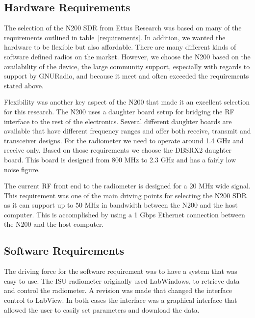 \subsection{Hardware Requirements}

The selection of the N200 SDR from Ettus Research was based on many of the requirements outlined in table~\ref{requirements}.  In addition, we wanted the hardware to be flexible but also affordable.  There are many different kinds of software defined radios on the market.  However, we choose the N200 based on the availability of the device, the large community support, especially with regards to support by GNURadio, and because it meet and often exceeded the requirements stated above.  

Flexibility was another key aspect of the N200 that made it an excellent selection for this research.  The N200 uses a daughter board setup for bridging the RF interface to the rest of the electronics.  Several different daughter boards are available that have different frequency ranges and offer both receive, transmit and transceiver designs.  For the radiometer we need to operate around 1.4 GHz and receive only.  Based on those requirements we choose the DBSRX2 daughter board.  This board is designed from 800 MHz to 2.3 GHz and has a fairly low noise figure.   

The current RF front end to the radiometer is designed for a 20 MHz wide signal.  This requirement was one of the main driving points for selecting the N200 SDR as it can support up to 50 MHz in bandwidth between the N200 and the host computer.  This is accomplished by using a 1 Gbps Ethernet connection between the N200 and the host computer.

\subsection{Software Requirements}

The driving force for the software requirement was to have a system that was easy to use.  The ISU radiometer originally used LabWindows, to retrieve data and control the radiometer.  A revision was made that changed the interface control to LabView.  In both cases the interface was a graphical interface that allowed the user to easily set parameters and download the data.

